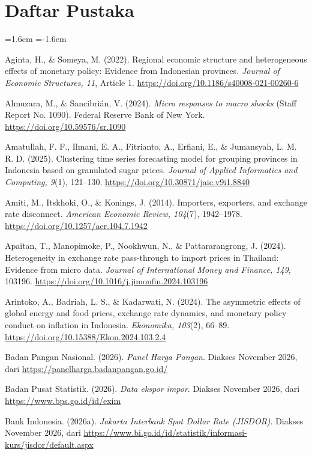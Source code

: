 \documentclass[11pt,a4paper]{article}
\newcommand{\refitem}[1]{\item\label{ref:#1}}
\begin{document}
\clearpage
\section*{Daftar Pustaka}
\begingroup\small
\begin{list}{}{\leftmargin=1.6em \itemindent=-1.6em \itemsep=1.5pt \parsep=0pt \topsep=2pt}
\refitem{aginta2022} Aginta, H., \& Someya, M. (2022). Regional economic structure and heterogeneous effects of monetary policy:
Evidence from Indonesian provinces. \textit{Journal of Economic Structures, 11}, Article 1. \url{https://doi.org/10.1186/s40008-021-00260-6}
\refitem{almuzara2024} Almuzara, M., \& Sancibrián, V. (2024). \textit{Micro responses to macro shocks} (Staff Report No. 1090).
Federal Reserve Bank of New York. \url{https://doi.org/10.59576/sr.1090}
\refitem{amatullah2025} Amatullah, F. F., Ilmani, E. A., Fitrianto, A., Erfiani, E., \& Jumansyah, L. M. R. D. (2025). Clustering time
series forecasting model for grouping provinces in Indonesia based on granulated sugar prices. \textit{Journal of Applied Informatics
and Computing, 9}(1), 121–130. \url{https://doi.org/10.30871/jaic.v9i1.8840}
\refitem{amiti2014} Amiti, M., Itskhoki, O., \& Konings, J. (2014). Importers, exporters, and exchange rate disconnect.
\textit{American Economic Review, 104}(7), 1942–1978. \url{https://doi.org/10.1257/aer.104.7.1942}
\refitem{apaitan2024} Apaitan, T., Manopimoke, P., Nookhwun, N., \& Pattararangrong, J. (2024). Heterogeneity in exchange rate
pass-through to import prices in Thailand: Evidence from micro data. \textit{Journal of International Money and Finance, 149},
103196. \url{https://doi.org/10.1016/j.jimonfin.2024.103196}
\refitem{arintoko2024} Arintoko, A., Badriah, L. S., \& Kadarwati, N. (2024). The asymmetric effects of global energy and food prices,
exchange rate dynamics, and monetary policy conduct on inflation in Indonesia. \textit{Ekonomika, 103}(2), 66–89.
\url{https://doi.org/10.15388/Ekon.2024.103.2.4}
\refitem{bapanas2026} Badan Pangan Nasional. (2026). \textit{Panel Harga Pangan}. Diakses November 2026, dari
\url{https://panelharga.badanpangan.go.id/}
\refitem{bps2026} Badan Pusat Statistik. (2026). \textit{Data ekspor impor}. Diakses November 2026, dari \url{https://www.bps.go.id/id/exim}
\refitem{bijisdor2026} Bank Indonesia. (2026a). \textit{Jakarta Interbank Spot Dollar Rate (JISDOR)}. Diakses November 2026, dari
\url{https://www.bi.go.id/id/statistik/informasi-kurs/jisdor/default.aspx}

\end{list}
\end{document}
